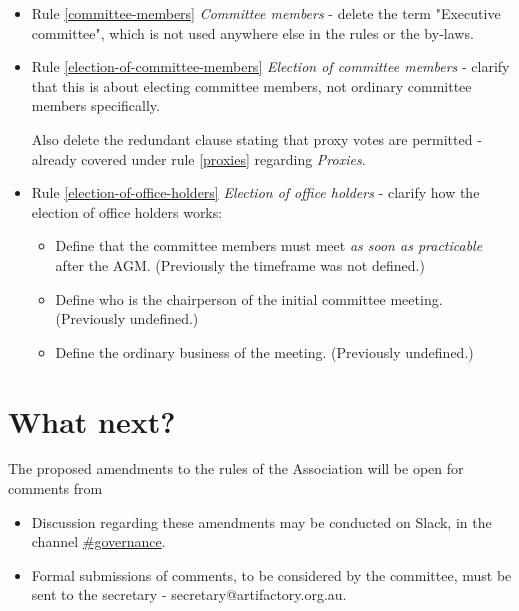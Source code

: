 \documentclass[../constitution.tex]{subfiles}
\begin{document}
\begin{itemize}


\item Rule \ref{committee-members} \textit{Committee members} - delete the term "Executive committee", which is not used anywhere else in the rules or the by-laws.

\item Rule \ref{election-of-committee-members} \textit{Election of committee members} - clarify that this is about electing committee members, not ordinary committee members specifically.

Also delete the redundant clause stating that proxy votes are permitted - already covered under rule \ref{proxies} regarding \textit{Proxies}.

\item Rule \ref{election-of-office-holders} \textit{Election of office holders} - clarify how the election of office holders works:

  \begin{itemize}
  \item Define that the committee members must meet \textit{as soon as practicable} after the AGM. (Previously the timeframe was not defined.)
  \item Define who is the chairperson of the initial committee meeting. (Previously undefined.)
  \item Define the ordinary business of the meeting. (Previously undefined.)
  \end{itemize}

\end{itemize}

\section*{What next?}

The proposed amendments to the rules of the Association will be open for comments from 

\begin{itemize}
    \item Discussion regarding these amendments may be conducted on Slack, in the channel \href{https://perthartifactory.slack.com/archives/C04GDNBFGN5}{\#governance}.
    \item Formal submissions of comments, to be considered by the committee, must be sent to the secretary - secretary@artifactory.org.au.
\end{itemize}
\end{document}
